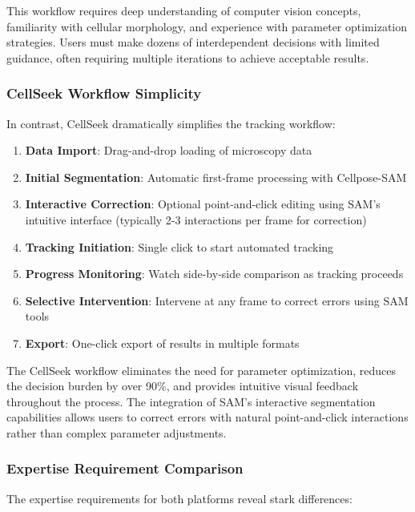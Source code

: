 \documentclass[../cellseek_paper.tex]{subfiles}
\begin{document}
This workflow requires deep understanding of computer vision concepts, familiarity with cellular morphology, and experience with parameter optimization strategies. Users must make dozens of interdependent decisions with limited guidance, often requiring multiple iterations to achieve acceptable results.

\subsubsection{CellSeek Workflow Simplicity}

In contrast, CellSeek dramatically simplifies the tracking workflow:

\begin{enumerate}
  \item \textbf{Data Import}: Drag-and-drop loading of microscopy data
  \item \textbf{Initial Segmentation}: Automatic first-frame processing with Cellpose-SAM
  \item \textbf{Interactive Correction}: Optional point-and-click editing using SAM's intuitive interface (typically 2-3 interactions per frame for correction)
  \item \textbf{Tracking Initiation}: Single click to start automated tracking
  \item \textbf{Progress Monitoring}: Watch side-by-side comparison as tracking proceeds
  \item \textbf{Selective Intervention}: Intervene at any frame to correct errors using SAM tools
  \item \textbf{Export}: One-click export of results in multiple formats
\end{enumerate}

The CellSeek workflow eliminates the need for parameter optimization, reduces the decision burden by over 90\%, and provides intuitive visual feedback throughout the process. The integration of SAM's interactive segmentation capabilities allows users to correct errors with natural point-and-click interactions rather than complex parameter adjustments.

\subsubsection{Expertise Requirement Comparison}

The expertise requirements for both platforms reveal stark differences:
\end{document}
